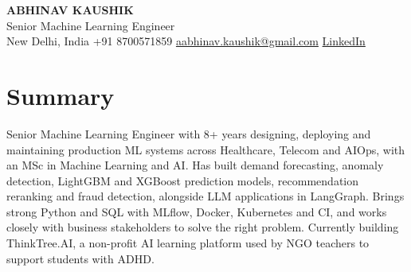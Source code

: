 \documentclass[10pt,a4paper]{article}
\begin{document}
\begin{center}
  {\LARGE\bfseries ABHINAV KAUSHIK}\\[2pt]
  {\large Senior Machine Learning Engineer}\\[2pt]
  New Delhi, India \textbar{} +91 8700571859 \textbar{} \href{mailto:aabhinav.kaushik@gmail.com}{aabhinav.kaushik@gmail.com} \textbar{} \href{https://www.linkedin.com/in/abhinav-kaushik10/}{LinkedIn}  
\end{center}

\section{Summary}
Senior Machine Learning Engineer with 8+ years designing, deploying and maintaining production ML systems across Healthcare, Telecom and AIOps, with an MSc in Machine Learning and AI. Has built demand forecasting, anomaly detection, LightGBM and XGBoost prediction models, recommendation reranking and fraud detection, alongside LLM applications in LangGraph. Brings strong Python and SQL with MLflow, Docker, Kubernetes and CI, and works closely with business stakeholders to solve the right problem. Currently building ThinkTree.AI, a non-profit AI learning platform used by NGO teachers to support students with ADHD.
\end{document}

